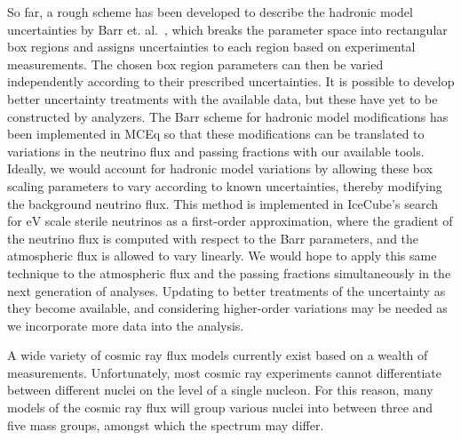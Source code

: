 So far, a rough scheme has been developed to describe the hadronic model uncertainties by Barr et. al.~\cite{Barr:2004br}, which breaks the parameter space into rectangular box regions and assigns uncertainties to each region based on experimental measurements.
The chosen box region parameters can then be varied independently according to their prescribed uncertainties.
It is possible to develop better uncertainty treatments with the available data, but these have yet to be constructed by analyzers.
The Barr scheme for hadronic model modifications has been implemented in MCEq so that these modifications can be translated to variations in the neutrino flux and passing fractions with our available tools.
Ideally, we would account for hadronic model variations by allowing these box scaling parameters to vary according to known uncertainties, thereby modifying the background neutrino flux.
This method is implemented in IceCube's search for $\si\eV$ scale sterile neutrinos as a first-order approximation, where the gradient of the neutrino flux is computed with respect to the Barr parameters, and the atmospheric flux is allowed to vary linearly.
We would hope to apply this same technique to the atmospheric flux and the passing fractions simultaneously in the next generation of analyses.
Updating to better treatments of the uncertainty as they become available, and considering higher-order variations may be needed as we incorporate more data into the analysis.

A wide variety of cosmic ray flux models currently exist based on a wealth of measurements.
Unfortunately, most cosmic ray experiments cannot differentiate between different nuclei on the level of a single nucleon.
For this reason, many models of the cosmic ray flux will group various nuclei into between three and five mass groups, amongst which the spectrum may differ.

